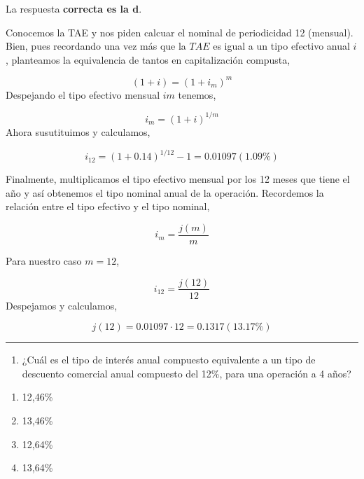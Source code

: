 \documentclass[
  letterpaper,
  DIV=11,
  numbers=noendperiod]{scrreprt}
\providecommand{\tightlist}{%
  \setlength{\itemsep}{0pt}\setlength{\parskip}{0pt}}\usepackage{longtable,booktabs,array}
\begin{document}
\begin{tcolorbox}[enhanced jigsaw, left=2mm, opacityback=0, colback=white, breakable, arc=.35mm, bottomrule=.15mm, rightrule=.15mm, toprule=.15mm, leftrule=.75mm, colframe=quarto-callout-tip-color-frame]
\begin{minipage}[t]{5.5mm}
\textcolor{quarto-callout-tip-color}{\faLightbulb}
\end{minipage}%
\begin{minipage}[t]{\textwidth - 5.5mm}

La respuesta \textbf{correcta es la d}.

Conocemos la TAE y nos piden calcuar el nominal de periodicidad 12
(mensual). Bien, pues recordando una vez más que la \(TAE\) es igual a
un tipo efectivo anual \(i\), planteamos la equivalencia de tantos en
capitalización compusta,

\[(1+i)=(1+ i _m)^m\] Despejando el tipo efectivo mensual \(im\)
tenemos,

\[i_m=(1+i)^{1/m}\] Ahora susutituimos y calculamos,

\[i_{12}=(1+0.14)^{1/12}-1=0.01097(1.09\%)\]

Finalmente, multiplicamos el tipo efectivo mensual por los 12 meses que
tiene el año y así obtenemos el tipo nominal anual de la operación.
Recordemos la relación entre el tipo efectivo y el tipo nominal,

\[i_m= \frac {j(m)}{m}\]

Para nuestro caso \(m=12\),

\[i_{12}= \frac {j(12)}{12}\] Despejamos y calculamos,

\[{j(12)}=0.01097 \cdot {12}=0.1317(13.17\%)\]

\end{minipage}%
\end{tcolorbox}

\begin{center}\rule{0.5\linewidth}{0.5pt}\end{center}

\begin{enumerate}
\def\labelenumi{\arabic{enumi}.}
\setcounter{enumi}{17}
\tightlist
\item
  ¿Cuál es el tipo de interés anual compuesto equivalente a un tipo de
  descuento comercial anual compuesto del 12\%, para una operación a 4
  años?
\end{enumerate}

\begin{enumerate}
\def\labelenumi{\alph{enumi})}
\item
  12,46\%
\item
  13,46\%
\item
  12,64\%
\item
  13,64\%
\end{enumerate}
\end{document}
